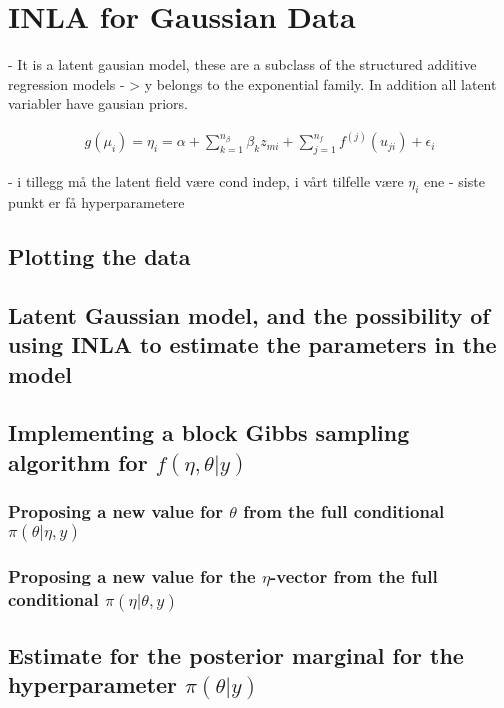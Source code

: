 \section{INLA for Gaussian Data}

- It is a latent gausian model, these are a subclass of the structured additive regression models - > y belongs to the exponential family. In addition all latent variabler have gausian priors. 

\begin{equation}
\begin{split}
    g(\mu_i) = \eta_i = \alpha + \sum_{k = 1}^{n_\beta} \beta_k z_{mi} + \sum_{j = 1}^{n_f}f^{(j)}(u_{ji}) + \epsilon_i
\end{split}
\end{equation}

- i tillegg må the latent field være cond indep, i vårt tilfelle være $\eta_i$ ene
- siste punkt er få hyperparametere

\subsection{Plotting the data}

\subsection{Latent Gaussian model, and the possibility of using INLA to estimate the parameters in the model}

\subsection{Implementing a block Gibbs sampling algorithm for $f(\eta, \theta |y)$}

\subsubsection{Proposing a new value for $\theta$ from the full conditional $\pi(\theta | \eta,y)$}

\subsubsection{Proposing a new value for the $\eta$-vector from the full conditional $\pi(\eta | \theta, y)$}

\subsection{Estimate for the posterior marginal for the hyperparameter $\pi(\theta|y)$}

